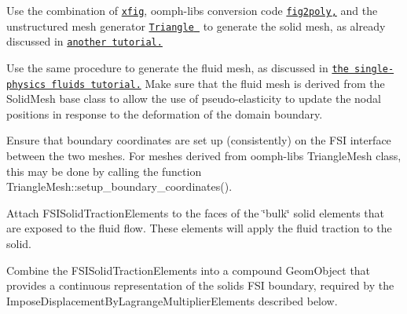 \begin{DoxyEnumerate}
\item Use the combination of \href{http://en.wikipedia.org/wiki/Xfig}{\tt xfig}, {\ttfamily oomph-\/lib\textquotesingle{}s} conversion code \href{../../../meshes/mesh_from_xfig/html/index.html}{\tt {\ttfamily fig2poly},} and the unstructured mesh generator \href{http://www.cs.cmu.edu/~quake/triangle.html}{\tt {\ttfamily Triangle} } to generate the solid mesh, as already discussed in \href{../../../solid/unstructured_solid/html/index.html#mesh}{\tt another tutorial.} ~\newline
~\newline

\item Use the same procedure to generate the fluid mesh, as discussed in \href{../../../navier_stokes/unstructured_fluid/html/index.html#mesh}{\tt the single-\/physics fluids tutorial.} Make sure that the fluid mesh is derived from the {\ttfamily Solid\+Mesh} base class to allow the use of pseudo-\/elasticity to update the nodal positions in response to the deformation of the domain boundary. ~\newline
~\newline

\item Ensure that boundary coordinates are set up (consistently) on the F\+SI interface between the two meshes. For meshes derived from {\ttfamily oomph-\/lib\textquotesingle{}s} {\ttfamily Triangle\+Mesh} class, this may be done by calling the function {\ttfamily Triangle\+Mesh\+::setup\+\_\+boundary\+\_\+coordinates()}. ~\newline
~\newline

\item Attach {\ttfamily F\+S\+I\+Solid\+Traction\+Elements} to the faces of the \char`\"{}bulk\char`\"{} solid elements that are exposed to the fluid flow. These elements will apply the fluid traction to the solid. ~\newline
~\newline

\item Combine the {\ttfamily F\+S\+I\+Solid\+Traction\+Elements} into a compound {\ttfamily Geom\+Object} that provides a continuous representation of the solid\textquotesingle{}s F\+SI boundary, required by the {\ttfamily Impose\+Displacement\+By\+Lagrange\+Multiplier\+Elements} described below. ~\newline
~\newline


\end{DoxyEnumerate}
